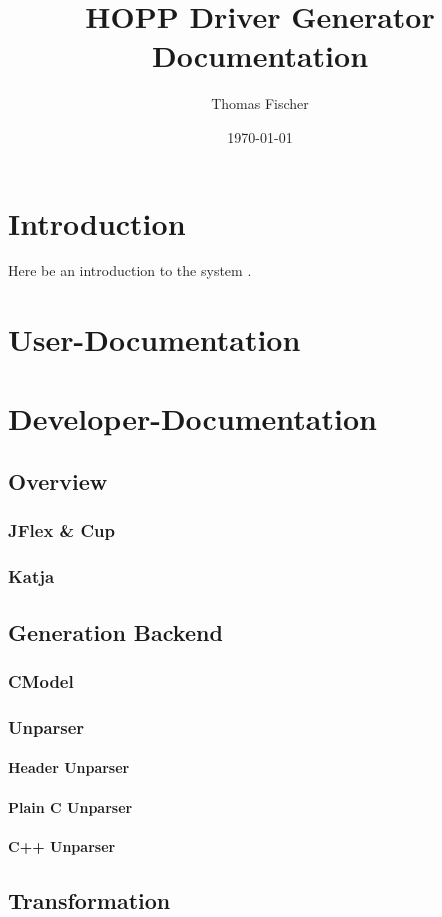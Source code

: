 \documentclass{article}
\begin{document}
\title{HOPP Driver Generator Documentation}
\author{Thomas Fischer}
\date{\today}

\maketitle
\thispagestyle{empty}
\newpage

\tableofcontents
\thispagestyle{empty}
\newpage

\section{Introduction}
Here be an introduction to the system \cite{fischer12}.

\section{User-Documentation}

\section{Developer-Documentation}

\subsection{Overview}

\subsubsection{JFlex \& Cup}

\subsubsection{Katja}

\subsection{Generation Backend}

\subsubsection{CModel}

\subsubsection{Unparser}

\paragraph{Header Unparser}

\paragraph{Plain C Unparser}

\paragraph{C++ Unparser}

\subsection{Transformation}

\newpage
\pagestyle{empty}


\end{document}
